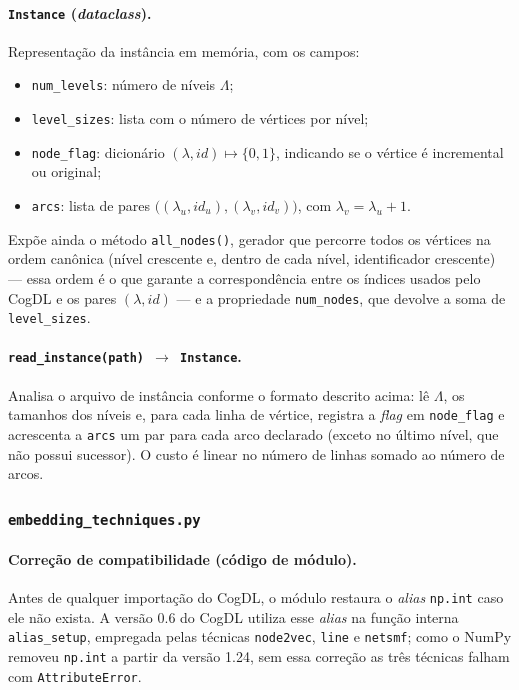 \documentclass[12pt,a4paper]{article}
\begin{document}
\paragraph{\texttt{Instance} (\textit{dataclass}).}
Representação da instância em memória, com os campos:
\begin{itemize}
  \item \texttt{num\_levels}: número de níveis $\Lambda$;
  \item \texttt{level\_sizes}: lista com o número de vértices por nível;
  \item \texttt{node\_flag}: dicionário $(\lambda, id) \mapsto \{0,1\}$,
        indicando se o vértice é incremental ou original;
  \item \texttt{arcs}: lista de pares
        $\big((\lambda_u, id_u), (\lambda_v, id_v)\big)$, com
        $\lambda_v = \lambda_u + 1$.
\end{itemize}
Expõe ainda o método \texttt{all\_nodes()}, gerador que percorre todos os
vértices na ordem canônica (nível crescente e, dentro de cada nível,
identificador crescente) --- essa ordem é o que garante a correspondência
entre os índices usados pelo CogDL e os pares $(\lambda, id)$ --- e a
propriedade \texttt{num\_nodes}, que devolve a soma de
\texttt{level\_sizes}.

\paragraph{\texttt{read\_instance(path) $\rightarrow$ Instance}.}
Analisa o arquivo de instância conforme o formato descrito acima:
lê $\Lambda$, os tamanhos dos níveis e, para cada linha de vértice,
registra a \textit{flag} em \texttt{node\_flag} e acrescenta a
\texttt{arcs} um par para cada arco declarado (exceto no último nível,
que não possui sucessor). O custo é linear no número de linhas somado ao
número de arcos.

\subsubsection{\texttt{embedding\_techniques.py}}

\paragraph{Correção de compatibilidade (código de módulo).}
Antes de qualquer importação do CogDL, o módulo restaura o \textit{alias}
\texttt{np.int} caso ele não exista. A versão 0.6 do CogDL utiliza esse
\textit{alias} na função interna \texttt{alias\_setup}, empregada pelas
técnicas \texttt{node2vec}, \texttt{line} e \texttt{netsmf}; como o NumPy
removeu \texttt{np.int} a partir da versão 1.24, sem essa correção as
três técnicas falham com \texttt{AttributeError}.
\end{document}
